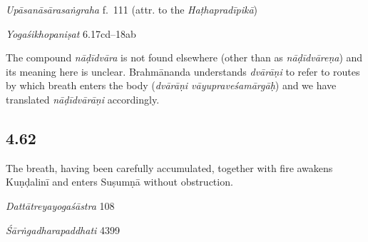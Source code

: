 \begin{ekdosis}
\begin{testimonia}[hp04_061]
\emph{Upāsanāsārasaṅgraha} f.~111 (attr. to the \emph{Haṭhapradīpikā})
\begin{versinnote}
\end{versinnote}

\emph{Yogaśikhopaniṣat} 6.17cd–18ab
\begin{versinnote}
\end{versinnote}
\end{testimonia}

\begin{philcomm}[hp04_061]
The compound \emph{nāḍīdvāra} is not found elsewhere (other than as \emph{nāḍīdvāreṇa}) and its meaning here is unclear. Brahmānanda understands \emph{dvārāṇi} to refer to routes by which breath enters the body (\emph{dvārāṇi vāyupraveśamārgāḥ}) and we have translated \emph{nāḍīdvārāṇi} accordingly.
\end{philcomm}

\subsection*{4.62}
\begin{translation}[hp04_062]
The breath, having been carefully accumulated, together with fire awakens Kuṇḍalinī and enters Suṣumṇā without obstruction.

\end{translation}

\begin{sources}[hp04_062]
\emph{Dattātreyayogaśāstra} 108
\begin{versinnote}
\end{versinnote}
\end{sources}

\begin{testimonia}[hp04_062]
\emph{Śārṅgadharapaddhati} 4399
\begin{versinnote}
\end{versinnote}


\end{testimonia}
\end{ekdosis}
